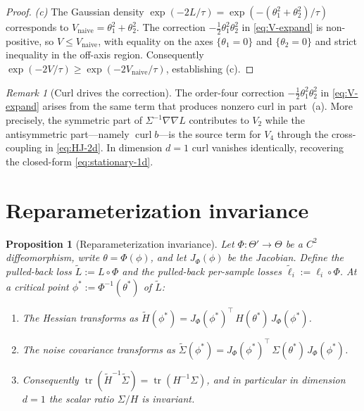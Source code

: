 \documentclass[11pt,a4paper]{article}
\newtheorem{proposition}[theorem]{Proposition}
\theoremstyle{definition}
\theoremstyle{remark}
\newtheorem{remark}[theorem]{Remark}
\DeclareMathOperator{\tr}{tr}
\DeclareMathOperator{\curl}{curl}
\begin{document}
\begin{proof}
   \emph{(c)} The Gaussian density $\exp(-2L/\tau) = \exp(-(\theta_1^2 +
   \theta_2^2)/\tau)$ corresponds to $V_{\text{naive}} =
   \theta_1^2+\theta_2^2$.  The correction $-\tfrac{1}{2}\theta_1^2
   \theta_2^2$ in \eqref{eq:V-expand} is non-positive, so $V \leq
   V_{\text{naive}}$, with equality on the axes $\{\theta_1=0\}$ and
   $\{\theta_2=0\}$ and strict inequality in the off-axis region.
   Consequently $\exp(-2V/\tau) \geq \exp(-2 V_{\text{naive}}/\tau)$,
   establishing (c).
\end{proof}

\begin{remark}[Curl drives the correction]\label{rem:curl-drives}
   The order-four correction $-\tfrac{1}{2}\theta_1^2\theta_2^2$ in
   \eqref{eq:V-expand} arises from the same term that produces nonzero
   curl in part~(a).  More precisely, the symmetric part of
   $\Sigma^{-1}\nabla\nabla L$ contributes to $V_2$ while the
   antisymmetric part---namely $\curl b$---is the source term for $V_4$
   through the cross-coupling in \eqref{eq:HJ-2d}.  In dimension $d=1$
   curl vanishes identically, recovering the closed-form
   \eqref{eq:stationary-1d}.
\end{remark}

\section{Reparameterization invariance}\label{sec:reparam}

\begin{proposition}[Reparameterization invariance]\label{prop:reparam}
   Let $\Phi:\Theta'\to \Theta$ be a $C^2$ diffeomorphism, write
   $\theta = \Phi(\phi)$, and let $J_\Phi(\phi)$ be the Jacobian.  Define
   the pulled-back loss $\widetilde L := L\circ\Phi$ and the pulled-back
   per-sample losses $\widetilde\ell_i := \ell_i\circ\Phi$.  At a critical
   point $\phi^* := \Phi^{-1}(\theta^*)$ of $\widetilde L$:
   \begin{enumerate}[label=\textnormal{(\alph*)}]
   \item The Hessian transforms as
       $\widetilde H(\phi^*) = J_\Phi(\phi^*)^{\!\top}\,H(\theta^*)\,
                                                            J_\Phi(\phi^*)$.
   \item The noise covariance transforms as
       $\widetilde\Sigma(\phi^*) = J_\Phi(\phi^*)^{\!\top}\,\Sigma(\theta^*)\,
                                                            J_\Phi(\phi^*)$.
   \item Consequently $\tr(\widetilde H^{-1}\widetilde\Sigma)
                        = \tr(H^{-1}\Sigma)$, and in particular in
       dimension $d=1$ the scalar ratio $\Sigma/H$ is invariant.
   \end{enumerate}
\end{proposition}
\end{document}
